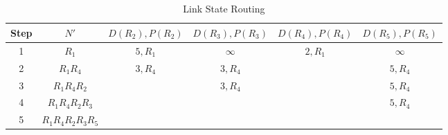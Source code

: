 \documentclass[en]{university}
\begin{document}
\subsection{}
\begin{table}[H]
    \centering
    \caption{Link State Routing}
    \label{tab:dijkstra}
    \begin{tabular}{|*6{c|}}
        \hline
        Step & $N'$                  & $D(R_2),P(R_2)$ & $D(R_3),P(R_3)$ & $D(R_4),P(R_4)$ & $D(R_5),P(R_5)$ \\
        \hline
        1    & $R_1$                 & $5,R_1$         & $\infty$        & $2,R_1$         & $\infty$        \\
        2    & $R_1 R_4$             & $3,R_4$         & $3,R_4$         &                 & $5,R_4$         \\
        3    & $R_1 R_4 R_2$         &                 & $3,R_4$         &                 & $5,R_4$         \\
        4    & $R_1 R_4 R_2 R_3$     &                 &                 &                 & $5,R_4$         \\
        5    & $R_1 R_4 R_2 R_3 R_5$ &                 &                 &                 &                 \\
        \hline
    \end{tabular}
\end{table}
\end{document}
